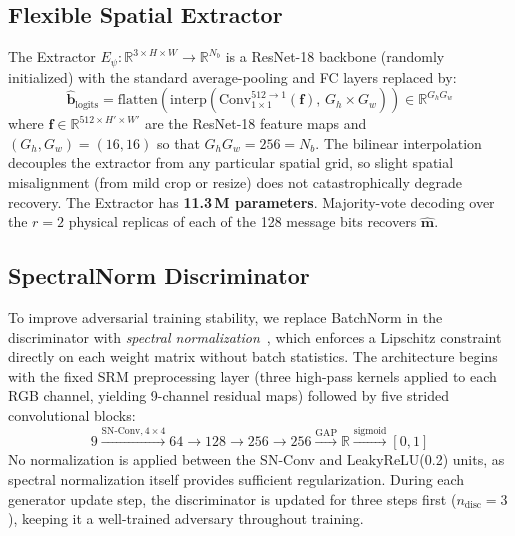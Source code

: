 \documentclass[journal]{IEEEtran}
\newcommand{\R}{\mathbb{R}}
\begin{document}
\subsection{Flexible Spatial Extractor}
\label{sec:extractor}

The Extractor $E_\psi:\R^{3\times H\times W}\to\R^{N_b}$ is a ResNet-18 backbone (randomly
initialized) with the standard average-pooling and FC layers replaced by:
\begin{equation}
    \hat{\mathbf{b}}_\text{logits} = \mathrm{flatten}\!\left(
        \mathrm{interp}\!\left(\mathrm{Conv}_{1\times1}^{512\to1}(\mathbf{f}),\,
        G_h\times G_w\right)\right)\in\R^{G_h G_w}
    \label{eq:extractor}
\end{equation}
where $\mathbf{f}\in\R^{512\times H'\times W'}$ are the ResNet-18 feature maps and
$(G_h,G_w)=(16,16)$ so that $G_h G_w = 256 = N_b$.
The bilinear interpolation decouples the extractor from any particular spatial grid, so slight
spatial misalignment (from mild crop or resize) does not catastrophically degrade recovery.
The Extractor has \textbf{11.3\,M parameters}.
Majority-vote decoding over the $r=2$ physical replicas of each of the 128 message bits
recovers $\hat{\mathbf{m}}$.

\subsection{SpectralNorm Discriminator}
\label{sec:discriminator}

To improve adversarial training stability, we replace BatchNorm in the discriminator with
\emph{spectral normalization}~\cite{miyato2018spectral}, which enforces a Lipschitz constraint
directly on each weight matrix without batch statistics.
The architecture begins with the fixed SRM preprocessing layer (three high-pass kernels applied
to each RGB channel, yielding 9-channel residual maps) followed by five strided convolutional
blocks:
\begin{equation}
    9 \xrightarrow{\text{SN-Conv}, 4\times4} 64 \to 128 \to 256 \to 256
    \xrightarrow{\text{GAP}} \R \xrightarrow{\text{sigmoid}} [0,1]
    \label{eq:discriminator}
\end{equation}
No normalization is applied between the SN-Conv and LeakyReLU(0.2) units, as spectral
normalization itself provides sufficient regularization.
During each generator update step, the discriminator is updated for three steps first
($n_\text{disc}=3$), keeping it a well-trained adversary throughout training.
\end{document}
